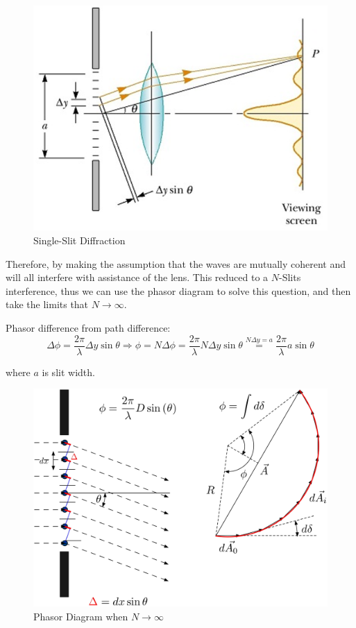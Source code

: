 \documentclass[openany]{book}
\begin{document}
\begin{figure}[H]
\centering
\label{fig:Single-Slit Diffraction}
\includegraphics[scale=0.6]{Figure/25.PNG}
\caption{Single-Slit Diffraction}
\end{figure}

Therefore, by making the assumption that the waves are mutually coherent and will all interfere with assistance of the lens. This reduced to a $N$-Slits interference, thus we can use the phasor diagram to solve this question, and then take the limits that $N\to \infty$.

Phasor difference from path difference:
\[\Delta \phi =\frac{2\pi }{\lambda }\Delta y\sin \theta \Rightarrow \phi =N\Delta \phi =\frac{2\pi }{\lambda }N\Delta y\sin \theta \overset{N\Delta y=a}{=}\frac{2\pi }{\lambda }a\sin \theta \]

where $a$ is slit width.

\begin{figure}[H]
\centering
\label{fig:Single-Slit Diffraction1}
\includegraphics[scale=0.4]{Figure/Phasor_3.PNG}
\caption{Phasor Diagram when $N\to \infty$}
\end{figure}
\end{document}
